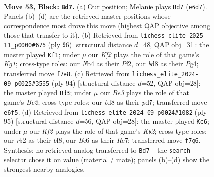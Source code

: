 \documentclass[11pt]{article}
\begin{document}
\clearpage

\begin{figure}[p]\centering
\begin{subfigure}{0.46\textwidth}\centering
\resizebox{\linewidth}{!}{%
\newchessgame
\chessboard[
  setfen={1R1B4/5k2/2r1b3/1p6/rn6/4P1Pp/1R3P2/7K b - - 1 53},
  showmover=false,
  pgfstyle=straightmove, color=movearrow, markmove={e6-d7}
]}
\caption{}
\end{subfigure}\hfill
\begin{subfigure}{0.46\textwidth}\centering
\resizebox{\linewidth}{!}{%
\newchessgame
\chessboard[
  setfen={6b1/k1pr4/P7/1p3N1R/6P1/3p4/4rP2/3R2K1 w - - 0 49},
  showmover=false,
  pgfstyle=straightmove, color=movearrow, markmove={g1-f1}
]}
\caption{}
\end{subfigure}
\\[4pt]
\begin{subfigure}{0.46\textwidth}\centering
\resizebox{\linewidth}{!}{%
\newchessgame
\chessboard[
  setfen={8/1r1p1k2/4p3/3p2P1/1P6/1R3K2/4B3/2r5 w - - 1 48},
  showmover=false,
  pgfstyle=straightmove, color=movearrow, markmove={e2-d3}
]}
\caption{}
\end{subfigure}\hfill
\begin{subfigure}{0.46\textwidth}\centering
\resizebox{\linewidth}{!}{%
\newchessgame
\chessboard[
  setfen={5B2/1kr4p/1p1p4/4nPP1/1R2P3/4K3/8/8 b - - 2 48},
  showmover=false,
  pgfstyle=straightmove, color=movearrow, markmove={b7-c6}
]}
\caption{}
\end{subfigure}
\caption{\textbf{Move 53, Black: \texttt{Bd7}.} (a) Our position; Melanie plays \texttt{Bd7} (\texttt{e6d7}). Panels (b)--(d) are the retrieved master positions whose correspondence most drove this move (highest QAP objective among those that transfer to it). (b) Retrieved from \texttt{lichess\_elite\_2025-11\_p0000\#676} (ply 96) [structural distance $d$=48, QAP obj=31]: the master played \texttt{Kf1}; under $\mu$ our \emph{Kf2} plays the role of that game's \emph{Kg1}; cross-type roles: our \emph{N}b4 as their \emph{P}f2, our \emph{b}d8 as their \emph{P}g4; transferred move \texttt{f7e8}. (c) Retrieved from \texttt{lichess\_elite\_2024-09\_p0025\#3565} (ply 94) [structural distance $d$=52, QAP obj=28]: the master played \texttt{Bd3}; under $\mu$ our \emph{Be3} plays the role of that game's \emph{Be2}; cross-type roles: our \emph{b}d8 as their \emph{p}d7; transferred move \texttt{e6f5}. (d) Retrieved from \texttt{lichess\_elite\_2024-09\_p0024\#1082} (ply 95) [structural distance $d$=56, QAP obj=28]: the master played \texttt{Kc6}; under $\mu$ our \emph{Kf2} plays the role of that game's \emph{Kb2}; cross-type roles: our \emph{r}b2 as their \emph{b}f8, our \emph{B}e6 as their \emph{R}c7; transferred move \texttt{f7g6}. Synthesis: no retrieved analog transferred to \texttt{Bd7} -- the \texttt{search} selector chose it on value (material / mate); panels (b)--(d) show the strongest nearby analogies.}
\label{fig:thought-m105}
\end{figure}
\end{document}
